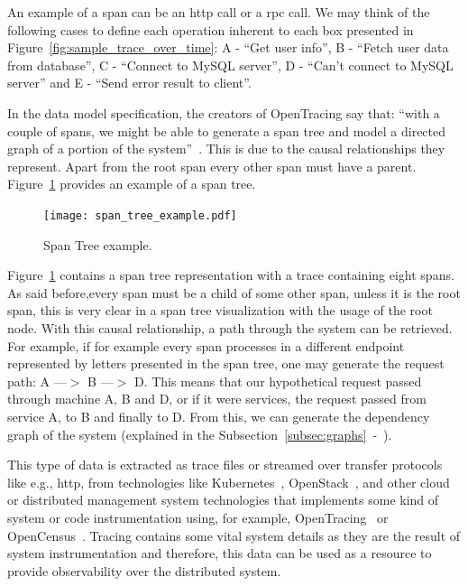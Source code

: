 An example of a span can be an \gls{http} call or a \gls{rpc} call. We may think of the following cases to define each operation inherent to each box presented in Figure~\ref{fig:sample_trace_over_time}: A - ``Get user info'', B - ``Fetch user data from database'', C - ``Connect to MySQL server'', D - ``Can't connect to MySQL server'' and E - ``Send error result to client''.

In the data model specification, the creators of OpenTracing say that: ``with a couple of spans, we might be able to generate a span tree and model a directed graph of a portion of the system''~\cite{open_tracing_data_model_specification}. This is due to the causal relationships they represent. Apart from the root span every other span must have a parent. Figure~\ref{fig:span_tree_example} provides an example of a span tree.

\begin{figure}[H]
    \centering
    \texttt{[image: span\_tree\_example.pdf]}
    \caption{Span Tree example.}
    \label{fig:span_tree_example}
\end{figure}

Figure~\ref{fig:span_tree_example} contains a span tree representation with a trace containing eight spans. As said before,every span must be a child of some other span, unless it is the root span, this is very clear in a span tree visualization with the usage of the root node. With this causal relationship, a path through the system can be retrieved. For example, if for example every span processes in a different endpoint represented by letters presented in the span tree, one may generate the request path: A ---$>$ B ---$>$ D. This means that our hypothetical request passed through machine A, B and D, or if it were services, the request passed from service A, to B and finally to D. From this, we can generate the dependency graph of the system (explained in the Subsection~\ref{subsec:graphs}~-~).

This type of data is extracted as trace files or streamed over transfer protocols like e.g., \gls{http}, from technologies like Kubernetes~\cite{what_is_kubernetes}, OpenStack~\cite{what_is_opensatck}, and other cloud or distributed management system technologies that implements some kind of system or code instrumentation using, for example, OpenTracing~\cite{what_is_opentracing} or OpenCensus~\cite{what_is_opencensus}. Tracing contains some vital system details as they are the result of system instrumentation and therefore, this data can be used as a resource to provide observability over the distributed system.

